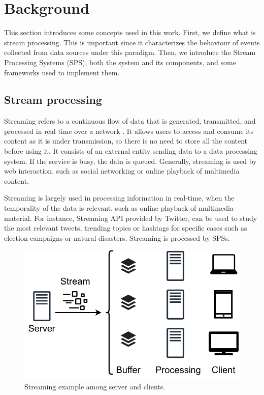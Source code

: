 %
\chapter{Background}
\label{background}
This section introduces some concepts used in this work. First, we define what is stream processing. This is important since it characterizes the behaviour of events collected from data sources under this paradigm. Then, we introduce the Stream Processing Systems (SPS), both the system and its components, and some frameworks used to implement them.


\section{Stream processing}
\label{stream-processing}
Streaming refers to a continuous flow of data that is generated, transmitted, and processed in real time over a network \cite{Menin2002SMH}. It allows users to access and consume its content as it is under transmission, so there is no need to store all the content before using it. It consists of an external entity sending data to a data processing system. If the service is busy, the data is queued. Generally, streaming is used by web interaction, such as social networking or online playback of multimedia content.

Streaming is largely used in processing information in real-time, when the temporality of the data is relevant, such as online playback of multimedia material. For instance, Streaming API provided by Twitter, can be used to study the most relevant tweets, trending topics or hashtags for specific cases such as election campaigns or natural disasters. Streaming is processed by SPSs.

\begin{figure}[ht!]
  \centering
    \includegraphics[scale=0.6]{figures/concepts/Streaming.pdf}
  \caption{Streaming example among server and clients.}
  \label{fig:streaming}
\end{figure}

